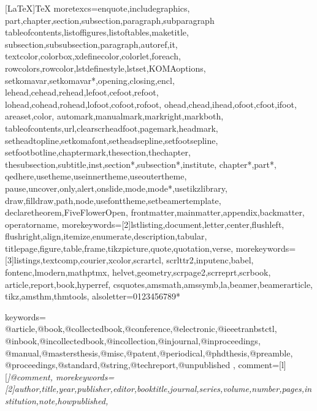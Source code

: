 \usepackage{listings}
[LaTeX]{TeX}%
  {moretexcs={enquote,includegraphics,%
    part,chapter,section,subsection,paragraph,subparagraph%
    tableofcontents,listoffigures,listoftables,maketitle,%
    subsection,subsubsection,paragraph,autoref,it,%
    textcolor,colorbox,xdefinecolor,colorlet,foreach,%
    rowcolors,rowcolor,lstdefinestyle,lstset,KOMAoptions,%
    setkomavar,setkomavar*,opening,closing,encl,%
    lehead,cehead,rehead,lefoot,cefoot,refoot,%
    lohead,cohead,rohead,lofoot,cofoot,rofoot,%
    ohead,chead,ihead,ofoot,cfoot,ifoot,%
    areaset,color,%
    automark,manualmark,markright,markboth,%
    tableofcontents,url,clearscrheadfoot,pagemark,headmark,%
    setheadtopline,setkomafont,setheadsepline,setfootsepline,%
    setfootbotline,chaptermark,thesection,thechapter,%
    thesubsection,subtitle,inst,section*,subsection*,institute,%
    chapter*,part*,%
    qedhere,usetheme,useinnertheme,useoutertheme,%
    pause,uncover,only,alert,onslide,mode,mode*,usetikzlibrary,%
    draw,filldraw,path,node,usefonttheme,setbeamertemplate,%
    declaretheorem,FiveFlowerOpen,%
    frontmatter,mainmatter,appendix,backmatter,%
    operatorname},%
  morekeywords={[2]lstlisting,document,letter,center,flushleft,%
    flushright,align,itemize,enumerate,description,tabular,%
    titlepage,figure,table,frame,tikzpicture,quote,quotation,verse},%
  morekeywords={[3]listings,textcomp,courier,xcolor,scrartcl,%
    scrlttr2,inputenc,babel,%
    fontenc,lmodern,mathptmx,%
    helvet,geometry,scrpage2,scrreprt,scrbook,%
    article,report,book,hyperref,%
    csquotes,amsmath,amssymb,la,beamer,beamerarticle,%
    tikz,amsthm,thmtools},
  alsoletter={0123456789*}
  }%

  {keywords={%
      @article,@book,@collectedbook,@conference,@electronic,@ieeetranbstctl,%
      @inbook,@incollectedbook,@incollection,@injournal,@inproceedings,%
      @manual,@mastersthesis,@misc,@patent,@periodical,@phdthesis,@preamble,%
      @proceedings,@standard,@string,@techreport,@unpublished%
      },
   comment=[l][\itshape]{@comment},
   morekeywords={[2]author,title,year,publisher,editor,booktitle,journal,series,volume,number,pages,institution,note,howpublished},
  }



